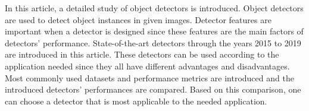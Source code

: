 \documentclass{article}
\begin{document}
\setlength{\parindent}{6ex}

\indent

In this article, a detailed study of object detectors is introduced. Object detectors 
are used to detect object instances in given images. Detector features are important when 
a detector is designed since these features are the main factors of detectors' performance. 
State-of-the-art detectors through the years 2015 to 2019 are introduced in this article. 
These detectors can be used according to the application needed since they all have different 
advantages and disadvantages. Most commonly used datasets and performance metrics are introduced 
and the introduced detectors' performances are compared. Based on this comparison, one can 
choose a detector that is most applicable to the needed application. 
\end{document}
